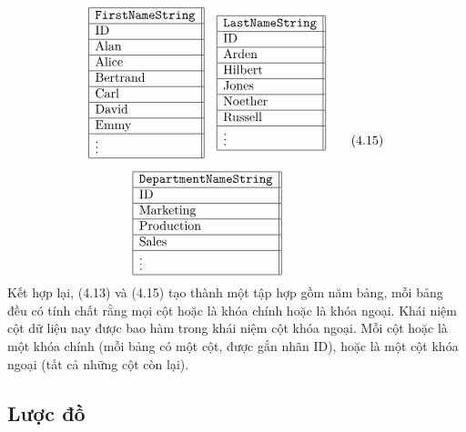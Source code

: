 \begin{equation}
\begin{gathered}
\begin{array}{|l||}\hline
\texttt{FirstNameString}\\\hline \text{ID}\\\hline
\text{Alan}\\\hline\text{Alice}\\\hline\text{Bertrand}\\\hline
\text{Carl}\\\hline\text{David}\\\hline\text{Emmy}\\\hline\vdots\\\hline
\end{array}
\quad
\begin{array}{|l||}\hline
\texttt{LastNameString}\\\hline \text{ID}\\\hline
\text{Arden}\\\hline\text{Hilbert}\\\hline\text{Jones}\\\hline
\text{Noether}\\\hline\text{Russell}\\\hline\vdots\\\hline
\end{array}\\[1.5ex]
\begin{array}{|l||}\hline
\texttt{DepartmentNameString}\\\hline \text{ID}\\\hline
\text{Marketing}\\\hline\text{Production}\\\hline\text{Sales}\\\hline\vdots\\\hline
\end{array}
\end{gathered}\tag{4.15}
\end{equation}
Kết hợp lại, (4.13) và (4.15) tạo thành một tập hợp gồm năm bảng, mỗi bảng đều có tính chất rằng mọi cột hoặc là khóa chính hoặc là khóa ngoại. Khái niệm cột dữ liệu nay được bao hàm trong khái niệm cột khóa ngoại. Mỗi cột hoặc là một khóa chính (mỗi bảng có một cột, được gắn nhãn ID), hoặc là một cột khóa ngoại (tất cả những cột còn lại).

\subsection{Lược đồ}

